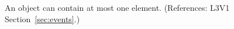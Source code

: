 An \Event object can contain at most one \Delay element. (References: L3V1
Section~\ref{sec:events}.)
